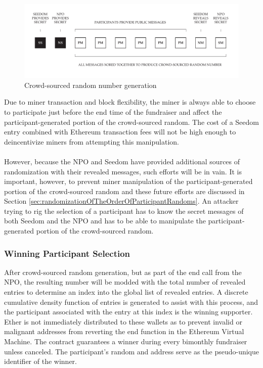 \documentclass[11pt]{article}
\begin{document}
\begin{figure}[H]
\begin{center}
\includegraphics[width=1.0\textwidth]{./graphics/crowd-sourced-random-number-generation.pdf}
\caption{Crowd-sourced random number generation}
\label{figure:crowdsourcedRandomNumberGeneration}
\end{center}
\end{figure}

Due to miner transaction and block flexibility, the miner is always able to choose to participate just before the end time of the fundraiser and affect the participant-generated portion of the crowd-sourced random. The cost of a Seedom entry combined with Ethereum transaction fees will not be high enough to deincentivize miners from attempting this manipulation.\\\\
However, because the NPO and Seedom have provided additional sources of randomization with their revealed messages, such efforts will be in vain. It is important, however, to prevent miner manipulation of the participant-generated portion of the crowd-sourced random and these future efforts are discussed in Section \ref{sec:randomizationOfTheOrderOfParticipantRandoms}. An attacker trying to rig the selection of a participant has to know the secret messages of both Seedom and the NPO and has to be able to manipulate the participant-generated portion of the crowd-sourced random.

\subsubsection{Winning Participant Selection}

After crowd-sourced random generation, but as part of the end call from the NPO, the resulting number will be modded with the total number of revealed entries to determine an index into the global list of revealed entries. A discrete cumulative density function of entries is generated to assist with this process, and the participant associated with the entry at this index is the winning supporter. Ether is not immediately distributed to these wallets as to prevent invalid or malignant addresses from reverting the end function in the Ethereum Virtual Machine. The contract guarantees a winner during every bimonthly fundraiser unless canceled. The participant's random and address serve as the pseudo-unique identifier of the winner.
\end{document}

